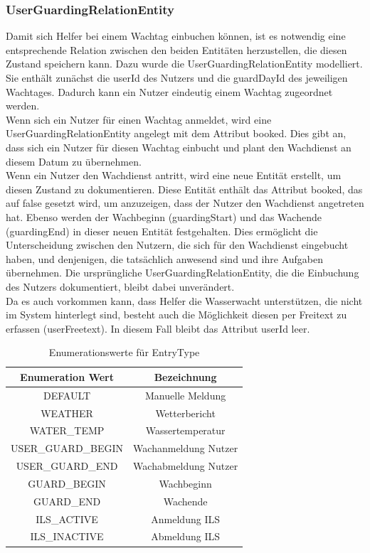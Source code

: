 \documentclass[fontsize=12pt,openright,oneside,paper=a4,BCOR=1cm]{scrbook}
\begin{document}
\subsubsection{UserGuardingRelationEntity}
Damit sich Helfer bei einem Wachtag einbuchen können, ist es notwendig eine entsprechende Relation zwischen den beiden Entitäten herzustellen, die diesen Zustand speichern kann. Dazu wurde die \glqq UserGuardingRelationEntity\grqq{} modelliert. Sie enthält zunächst die \glqq userId\grqq{} des Nutzers und die \glqq guardDayId\grqq{} des jeweiligen Wachtages. Dadurch kann ein Nutzer eindeutig einem Wachtag zugeordnet werden. \\
Wenn sich ein Nutzer für einen Wachtag anmeldet, wird eine \glqq UserGuardingRelationEntity\grqq{} angelegt mit dem Attribut \glqq booked\grqq{}. Dies gibt an, dass sich ein Nutzer für diesen Wachtag einbucht und plant den Wachdienst an diesem Datum zu übernehmen. \\
Wenn ein Nutzer den Wachdienst antritt, wird eine neue Entität erstellt, um diesen Zustand zu dokumentieren. Diese Entität enthält das Attribut \glqq booked\grqq{}, das auf \glqq false\grqq{} gesetzt wird, um anzuzeigen, dass der Nutzer den Wachdienst angetreten hat. Ebenso werden der Wachbeginn (\glqq guardingStart\grqq{}) und das Wachende (\glqq guardingEnd\grqq{}) in dieser neuen Entität festgehalten. Dies ermöglicht die Unterscheidung zwischen den Nutzern, die sich für den Wachdienst eingebucht haben, und denjenigen, die tatsächlich anwesend sind und ihre Aufgaben übernehmen. Die ursprüngliche \glqq UserGuardingRelationEntity\grqq{}, die die Einbuchung des Nutzers dokumentiert, bleibt dabei unverändert.\\
Da es auch vorkommen kann, dass Helfer die Wasserwacht unterstützen, die nicht im System hinterlegt sind, besteht auch die Möglichkeit diesen per Freitext zu erfassen (\glqq userFreetext\grqq{}). In diesem Fall bleibt das Attribut \glqq userId\grqq{} leer. 

\begin{table}[ht]
\centering
\caption{Enumerationswerte für \glqq EntryType\grqq{}}
\label{tab:entrytype}
\begin{tabular}{|c|c|}
\hline
Enumeration Wert & Bezeichnung \\
\hline
DEFAULT & Manuelle Meldung \\
WEATHER & Wetterbericht	 \\
WATER\_TEMP & Wassertemperatur \\
USER\_GUARD\_BEGIN & Wachanmeldung Nutzer\\
USER\_GUARD\_END & Wachabmeldung Nutzer\\
GUARD\_BEGIN & Wachbeginn\\
GUARD\_END & Wachende\\
ILS\_ACTIVE & Anmeldung ILS\\
ILS\_INACTIVE & Abmeldung ILS\\
\hline
\end{tabular}
\end{table}
\end{document}
